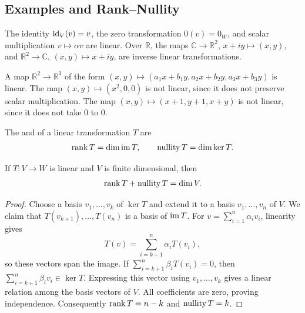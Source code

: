
\subsection{Examples and Rank--Nullity}

\begin{Example}
The identity $\mathrm{id}_V(v)=v$, the zero transformation $0(v)=0_W$, and scalar multiplication $v\mapsto\alpha v$ are linear. Over $\mathbb R$, the maps $\mathbb C\to\mathbb R^2$, $x+iy\mapsto(x,y)$, and $\mathbb R^2\to\mathbb C$, $(x,y)\mapsto x+iy$, are inverse linear transformations.

A map $\mathbb R^2\to\mathbb R^3$ of the form $(x,y)\mapsto(a_1x+b_1y,a_2x+b_2y,a_3x+b_3y)$ is linear. The map $(x,y)\mapsto(x^2,0,0)$ is not linear, since it does not preserve scalar multiplication. The map $(x,y)\mapsto(x+1,y+1,x+y)$ is not linear, since it does not take $0$ to $0$.
\end{Example}

\begin{Definition}
The  and  of a linear transformation $T$ are
\begin{equation*}
\rank T=\dim\operatorname{im} T,\qquad \operatorname{nullity} T=\dim\ker T.
\end{equation*}
\end{Definition}

\begin{Theorem}\label{thm:RankNullity}
If $T\colon V\to W$ is linear and $V$ is finite dimensional, then
\begin{equation*}
\rank T+\operatorname{nullity} T=\dim V.
\end{equation*}
\end{Theorem}
\begin{proof}
Choose a basis $v_1,\ldots,v_k$ of $\ker T$ and extend it to a basis $v_1,\ldots,v_n$ of $V$. We claim that $T(v_{k+1}),\ldots,T(v_n)$ is a basis of $\operatorname{im} T$. For $v=\sum_{i=1}^n\alpha_iv_i$, linearity gives
\begin{equation*}
T(v)=\sum_{i=k+1}^n\alpha_iT(v_i),
\end{equation*}
so these vectors span the image. If $\sum_{i=k+1}^n\beta_iT(v_i)=0$, then $\sum_{i=k+1}^n\beta_iv_i\in\ker T$. Expressing this vector using $v_1,\ldots,v_k$ gives a linear relation among the basis vectors of $V$. All coefficients are zero, proving independence. Consequently $\rank T=n-k$ and $\operatorname{nullity} T=k$.
\end{proof}

